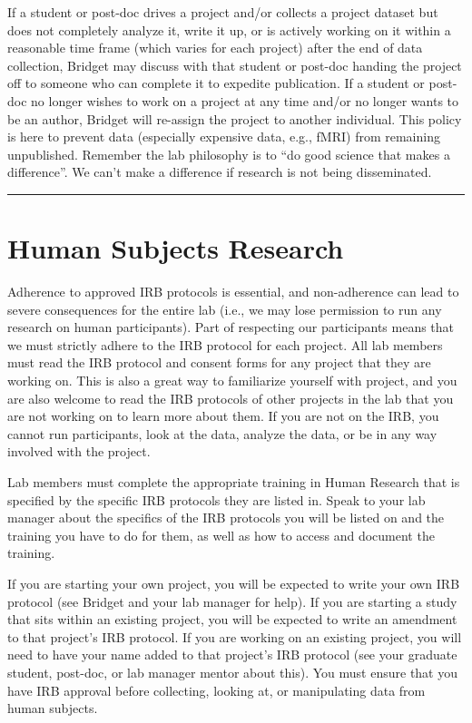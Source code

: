 \documentclass[]{book}
\begin{document}
If a student or post-doc drives a project and/or collects a project dataset but does not completely analyze it, write it up, or is actively working on it within a reasonable time frame (which varies for each project) after the end of data collection, Bridget may discuss with that student or post-doc handing the project off to someone who can complete it to expedite publication. If a student or post-doc no longer wishes to work on a project at any time and/or no longer wants to be an author, Bridget will re-assign the project to another individual. This policy is here to prevent data (especially expensive data, e.g., fMRI) from remaining unpublished. Remember the lab philosophy is to ``do good science that makes a difference''. We can't make a difference if research is not being disseminated.

\begin{center}\rule{0.5\linewidth}{0.5pt}\end{center}

\hypertarget{human-subjects-research}{%
\section{Human Subjects Research}\label{human-subjects-research}}

Adherence to approved IRB protocols is essential, and non-adherence can lead to severe consequences for the entire lab (i.e., we may lose permission to run any research on human participants). Part of respecting our participants means that we must strictly adhere to the IRB protocol for each project. All lab members must read the IRB protocol and consent forms for any project that they are working on. This is also a great way to familiarize yourself with project, and you are also welcome to read the IRB protocols of other projects in the lab that you are not working on to learn more about them. If you are not on the IRB, you cannot run participants, look at the data, analyze the data, or be in any way involved with the project.

Lab members must complete the appropriate training in Human Research that is specified by the specific IRB protocols they are listed in. Speak to your lab manager about the specifics of the IRB protocols you will be listed on and the training you have to do for them, as well as how to access and document the training.

If you are starting your own project, you will be expected to write your own IRB protocol (see Bridget and your lab manager for help). If you are starting a study that sits within an existing project, you will be expected to write an amendment to that project's IRB protocol. If you are working on an existing project, you will need to have your name added to that project's IRB protocol (see your graduate student, post-doc, or lab manager mentor about this). You must ensure that you have IRB approval before collecting, looking at, or manipulating data from human subjects.
\end{document}
